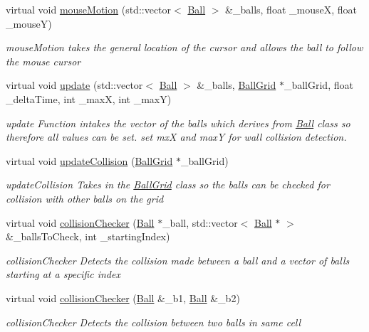\begin{DoxyCompactItemize}
virtual void \hyperlink{classColorTransferControl_a84567646b6a7d814aa8de8660da69543}{mouseMotion} (std::vector$<$ \hyperlink{structBall}{Ball} $>$ \&\_\-balls, float \_\-mouseX, float \_\-mouseY)
\begin{DoxyCompactList}\small\item\em mouseMotion takes the general location of the cursor and allows the ball to follow the mouse cursor \item\end{DoxyCompactList}\item 
virtual void \hyperlink{classColorTransferControl_add37c8ee8e911a13ecec98cf09fc81c4}{update} (std::vector$<$ \hyperlink{structBall}{Ball} $>$ \&\_\-balls, \hyperlink{classBallGrid}{BallGrid} $\ast$\_\-ballGrid, float \_\-deltaTime, int \_\-maxX, int \_\-maxY)
\begin{DoxyCompactList}\small\item\em update Function intakes the vector of the balls which derives from \hyperlink{structBall}{Ball} class so therefore all values can be set. set mxX and maxY for wall collision detection. \item\end{DoxyCompactList}\item 
virtual void \hyperlink{classColorTransferControl_a9f54f20a18940cf66c08a994eb8dfb01}{updateCollision} (\hyperlink{classBallGrid}{BallGrid} $\ast$\_\-ballGrid)
\begin{DoxyCompactList}\small\item\em updateCollision Takes in the \hyperlink{classBallGrid}{BallGrid} class so the balls can be checked for collision with other balls on the grid \item\end{DoxyCompactList}\item 
virtual void \hyperlink{classColorTransferControl_a082bba0dbe1e10809d9fb8dc2386a1da}{collisionChecker} (\hyperlink{structBall}{Ball} $\ast$\_\-ball, std::vector$<$ \hyperlink{structBall}{Ball} $\ast$ $>$ \&\_\-ballsToCheck, int \_\-startingIndex)
\begin{DoxyCompactList}\small\item\em collisionChecker Detects the collision made between a ball and a vector of balls starting at a specific index \item\end{DoxyCompactList}\item 
virtual void \hyperlink{classColorTransferControl_a9567be01e35663e82691d1756028899a}{collisionChecker} (\hyperlink{structBall}{Ball} \&\_\-b1, \hyperlink{structBall}{Ball} \&\_\-b2)
\begin{DoxyCompactList}\small\item\em collisionChecker Detects the collision between two balls in same cell \item\end{DoxyCompactList}\end{DoxyCompactItemize}


